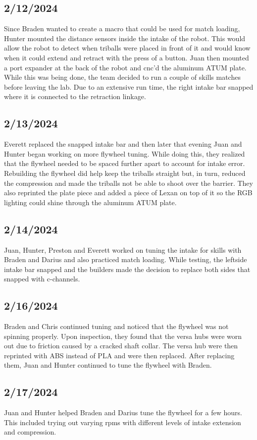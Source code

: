 
\subsection{2/12/2024}
Since Braden wanted to create a macro that could be used for match loading, Hunter mounted the distance sensors inside the
intake of the robot. This would allow the robot to detect when triballs were placed in front of it and would know when it
could extend and retract with the press of a button. Juan then mounted a port expander at the back of the robot and cnc'd 
the aluminum ATUM plate. While this was being done, the team decided to run a couple of skills matches before leaving
the lab. Due to an extensive run time, the right intake bar snapped where it is connected to the retraction linkage.

\subsection{2/13/2024}
Everett replaced the snapped intake bar and then later that evening Juan and Hunter began working on more flywheel tuning.
While doing this, they realized that the flywheel needed to be spaced further apart to account for intake error. Rebuilding 
the flywheel did help keep the triballs straight but, in turn, reduced the compression and made the triballs not be able
to shoot over the barrier. They also reprinted the plate piece and added a piece of Lexan on top of it so the RGB lighting
could shine through the aluminum ATUM plate.


\subsection{2/14/2024}
Juan, Hunter, Preston and Everett worked on tuning the intake for skills with Braden and Darius and also practiced
match loading. While testing, the leftside intake bar snapped and the builders made the decision to replace both sides 
that snapped with c-channels.


\subsection{2/16/2024}
Braden and Chris continued tuning and noticed that the flywheel was not spinning properly. Upon inspection, they
found that the versa hubs were worn out due to friction caused by a cracked shaft collar. The versa hub were then
reprinted with ABS instead of PLA and were then replaced. After replacing them, Juan and Hunter continued to tune the
flywheel with Braden.

\subsection{2/17/2024}
Juan and Hunter helped Braden and Darius tune the flywheel for a few hours. This included trying out varying rpms
with different levels of intake extension and compression.


